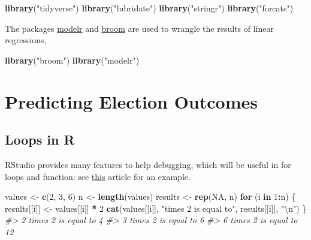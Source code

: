 \documentclass[]{book}
\newenvironment{Shaded}{\begin{snugshade}}{\end{snugshade}}
\newcommand{\KeywordTok}[1]{\textcolor[rgb]{0.13,0.29,0.53}{\textbf{#1}}}
\newcommand{\DecValTok}[1]{\textcolor[rgb]{0.00,0.00,0.81}{#1}}
\newcommand{\CharTok}[1]{\textcolor[rgb]{0.31,0.60,0.02}{#1}}
\newcommand{\StringTok}[1]{\textcolor[rgb]{0.31,0.60,0.02}{#1}}
\newcommand{\CommentTok}[1]{\textcolor[rgb]{0.56,0.35,0.01}{\textit{#1}}}
\newcommand{\OtherTok}[1]{\textcolor[rgb]{0.56,0.35,0.01}{#1}}
\newcommand{\ControlFlowTok}[1]{\textcolor[rgb]{0.13,0.29,0.53}{\textbf{#1}}}
\newcommand{\OperatorTok}[1]{\textcolor[rgb]{0.81,0.36,0.00}{\textbf{#1}}}
\newcommand{\NormalTok}[1]{#1}
\theoremstyle{definition}
\theoremstyle{definition}
\theoremstyle{definition}
\theoremstyle{remark}
\begin{document}
\begin{Shaded}
\begin{Highlighting}[]
\KeywordTok{library}\NormalTok{(}\StringTok{"tidyverse"}\NormalTok{)}
\KeywordTok{library}\NormalTok{(}\StringTok{"lubridate"}\NormalTok{)}
\KeywordTok{library}\NormalTok{(}\StringTok{"stringr"}\NormalTok{)}
\KeywordTok{library}\NormalTok{(}\StringTok{"forcats"}\NormalTok{)}
\end{Highlighting}
\end{Shaded}

The packages \href{https://cran.r-project.org/package=modelr}{modelr}
and \href{https://cran.r-project.org/package=broom}{broom} are used to
wrangle the results of linear regressions,

\begin{Shaded}
\begin{Highlighting}[]
\KeywordTok{library}\NormalTok{(}\StringTok{"broom"}\NormalTok{)}
\KeywordTok{library}\NormalTok{(}\StringTok{"modelr"}\NormalTok{)}
\end{Highlighting}
\end{Shaded}

\section{Predicting Election
Outcomes}\label{predicting-election-outcomes}

\subsection{Loops in R}\label{loops-in-r}

RStudio provides many features to help debugging, which will be useful
in for loops and function: see
\href{https://support.rstudio.com/hc/en-us/articles/205612627-Debugging-with-RStudio}{this}
article for an example.

\begin{Shaded}
\begin{Highlighting}[]
\NormalTok{values <-}\StringTok{ }\KeywordTok{c}\NormalTok{(}\DecValTok{2}\NormalTok{, }\DecValTok{3}\NormalTok{, }\DecValTok{6}\NormalTok{)}
\NormalTok{n <-}\StringTok{ }\KeywordTok{length}\NormalTok{(values)}
\NormalTok{results <-}\StringTok{ }\KeywordTok{rep}\NormalTok{(}\OtherTok{NA}\NormalTok{, n)}
\ControlFlowTok{for}\NormalTok{ (i }\ControlFlowTok{in} \DecValTok{1}\OperatorTok{:}\NormalTok{n) \{}
\NormalTok{  results[[i]] <-}\StringTok{ }\NormalTok{values[[i]] }\OperatorTok{*}\StringTok{ }\DecValTok{2}
  \KeywordTok{cat}\NormalTok{(values[[i]], }\StringTok{"times 2 is equal to"}\NormalTok{, results[[i]], }\StringTok{"}\CharTok{\textbackslash{}n}\StringTok{"}\NormalTok{)}
\NormalTok{\}}
\CommentTok{#> 2 times 2 is equal to 4 }
\CommentTok{#> 3 times 2 is equal to 6 }
\CommentTok{#> 6 times 2 is equal to 12}
\end{Highlighting}
\end{Shaded}
\end{document}
